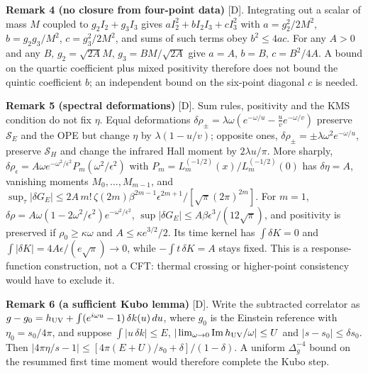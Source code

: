 \textbf{Remark 4 (no closure from four-point data)} [D]. Integrating out a scalar of mass $M$ coupled to $g_2I_2+g_3I_3$ gives
$aI_2^2+bI_2I_3+cI_3^2$ with $a=g_2^2/2M^2$, $b=g_2g_3/M^2$, $c=g_3^2/2M^2$, and sums of such terms obey $b^2\le4ac$. For any
$A>0$ and any $B$, $g_2=\sqrt{2A}M$, $g_3=BM/\sqrt{2A}$ give $a=A$, $b=B$, $c=B^2/4A$. A bound on the quartic coefficient plus
mixed positivity therefore does not bound the quintic coefficient $b$; an independent bound on the six-point diagonal $c$ is
needed.

\textbf{Remark 5 (spectral deformations)} [D]. Sum rules, positivity and the KMS condition do not fix $\eta$. Equal
deformations $\delta\rho_\pm=\lambda\omega(e^{-\omega/u}-\tfrac uve^{-\omega/v})$ preserve $\mathcal S_E$ and the OPE but change
$\eta$ by $\lambda(1-u/v)$; opposite ones, $\delta\rho_\pm=\pm\lambda\omega^2e^{-\omega/u}$, preserve $\mathcal S_H$ and change
the infrared Hall moment by $2\lambda u/\pi$. More sharply, $\delta\rho_\epsilon=A\omega e^{-\omega^2/\epsilon^2}P_m(\omega^2/\epsilon^2)$
with $P_m=L_m^{(-1/2)}(x)/L_m^{(-1/2)}(0)$ has $\delta\eta=A$, vanishing moments $M_0,\dots,M_{m-1}$, and
$\sup_\tau|\delta G_E|\le2A\,m!\,\zeta(2m)\beta^{2m-1}\epsilon^{2m+1}/[\sqrt\pi(2\pi)^{2m}]$. For $m=1$,
$\delta\rho=A\omega(1-2\omega^2/\epsilon^2)e^{-\omega^2/\epsilon^2}$, $\sup|\delta G_E|\le A\beta\epsilon^3/(12\sqrt\pi)$, and positivity
is preserved if $\rho_0\ge\kappa\omega$ and $A\le\kappa e^{3/2}/2$. Its time kernel has $\int\delta K=0$ and
$\int|\delta K|=4A\epsilon/(e\sqrt\pi)\to0$, while $-\int t\,\delta K=A$ stays fixed. This is a response-function construction,
not a CFT: thermal crossing or higher-point consistency would have to exclude it.

\textbf{Remark 6 (a sufficient Kubo lemma)} [D]. Write the subtracted correlator as $g-g_0=h_{\rm UV}+\int(e^{i\omega u}-1)\,\delta k(u)\,du$,
where $g_0$ is the Einstein reference with $\eta_0=s_0/4\pi$, and suppose $\int|u\,\delta k|\le E$,
$|\lim_{\omega\to0}{\rm Im}\,h_{\rm UV}/\omega|\le U$ and $|s-s_0|\le\delta s_0$. Then $|4\pi\eta/s-1|\le[4\pi(E+U)/s_0+\delta]/(1-\delta)$.
A uniform $\Delta_g^{-4}$ bound on the resummed first time moment would therefore complete the Kubo step.

